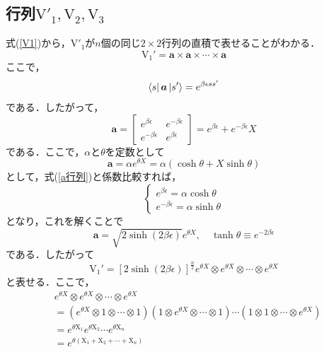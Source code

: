 \documentclass[a4paper,11pt]{jsreport}
\begin{document}
\subsection{行列$\mathrm{V}'_1, \mathrm{V}_2, \mathrm{V}_3$}
式(\ref{V1})から，$\mathrm{V}'_1$が$n$個の同じ$2 \times 2$行列の直積で表せることがわかる．
\begin{equation}
  \mathrm{V}_1'=\bm{a} \times \bm{a} \times \cdots \times \bm{a}
\end{equation}
ここで，
\begin{equation}
  \bra{s}\bm{a} \ket{s'}
  =e^{\beta \epsilon s s'}
\end{equation}
である．したがって，
\begin{equation}
  \bm{a}=\left[\begin{array}{cc}
      e^{\beta \epsilon}  & e^{-\beta \epsilon} \\
      e^{-\beta \epsilon} & e^{\beta \epsilon}
    \end{array}\right]=e^{\beta \epsilon}+e^{-\beta \epsilon} X
    \label{a行列}
\end{equation}
である．ここで，$\alpha$と$\theta$を定数として
\begin{equation}
  \bm{a} 
  = \alpha e^{\theta X}
  = \alpha (\cosh{\theta} + X \sinh{\theta})
\end{equation}
として，式(\ref{a行列})と係数比較すれば，
\begin{equation}
  \begin{cases}
    e^{\beta \epsilon} = \alpha \cosh{\theta} \\
    e^{- \beta \epsilon} = \alpha \sinh{\theta}
  \end{cases}
\end{equation}
となり，これを解くことで
\begin{equation}
  \bm{a}
  =\sqrt{2 \sinh (2 \beta \epsilon)} e^{\theta X}, \quad
  \tanh \theta \equiv e^{-2 \beta \epsilon}
\end{equation}
である．したがって
\begin{equation}
  \mathrm{V}_1'=[2 \sinh (2 \beta \epsilon)]^{\frac{n}{2}} e^{\theta X} \otimes e^{\theta X} \otimes \cdots \otimes e^{\theta X}
\end{equation}
と表せる．ここで，
\begin{align}
  &e^{\theta X} \otimes e^{\theta X} \otimes \cdots \otimes e^{\theta X} \\
  &= (e^{\theta X} \otimes 1 \otimes \cdots \otimes 1) (1 \otimes e^{\theta X} \otimes \cdots \otimes 1) \cdots (1 \otimes 1 \otimes \cdots \otimes e^{\theta X}) \\
  &= e^{\theta \mathrm{X}_1} e^{\theta \mathrm{X}_2} \cdots e^{\theta \mathrm{X}_n} \\
  &= e^{\theta\left(\mathrm{X}_1+\mathrm{X}_2+\cdots+\mathrm{X}_n\right)}
\end{align}
\end{document}
